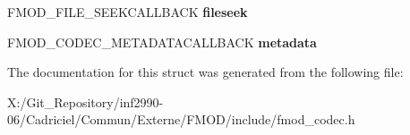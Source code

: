 \begin{DoxyCompactItemize}
\item 
\hypertarget{struct_f_m_o_d___c_o_d_e_c___s_t_a_t_e_a687641e4351497085141f91e70831928}{F\-M\-O\-D\-\_\-\-F\-I\-L\-E\-\_\-\-S\-E\-E\-K\-C\-A\-L\-L\-B\-A\-C\-K {\bfseries fileseek}}\label{struct_f_m_o_d___c_o_d_e_c___s_t_a_t_e_a687641e4351497085141f91e70831928}

\item 
\hypertarget{struct_f_m_o_d___c_o_d_e_c___s_t_a_t_e_ac567cbf774e3f9dbbc8a3c4dd351ddd4}{F\-M\-O\-D\-\_\-\-C\-O\-D\-E\-C\-\_\-\-M\-E\-T\-A\-D\-A\-T\-A\-C\-A\-L\-L\-B\-A\-C\-K {\bfseries metadata}}\label{struct_f_m_o_d___c_o_d_e_c___s_t_a_t_e_ac567cbf774e3f9dbbc8a3c4dd351ddd4}

\end{DoxyCompactItemize}


The documentation for this struct was generated from the following file\-:\begin{DoxyCompactItemize}
\item 
X\-:/\-Git\-\_\-\-Repository/inf2990-\/06/\-Cadriciel/\-Commun/\-Externe/\-F\-M\-O\-D/include/fmod\-\_\-codec.\-h\end{DoxyCompactItemize}
